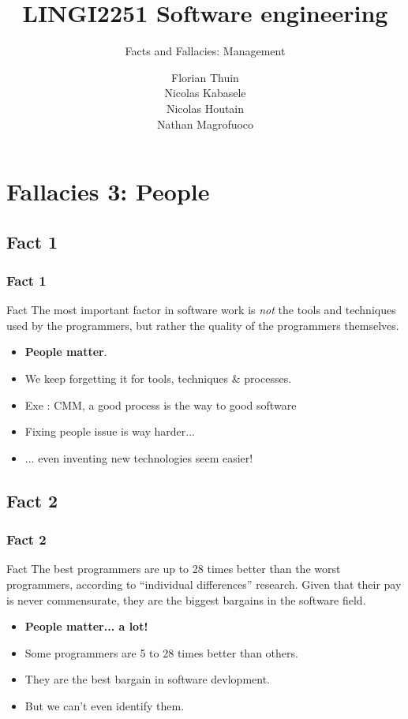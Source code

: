 \documentclass{beamer}
\title{LINGI2251 Software engineering}
\subtitle{Facts and Fallacies: Management}
\author{Florian Thuin \\ Nicolas Kabasele \\ Nicolas Houtain \\ Nathan Magrofuoco}
\institute{Ecole Polytechnique de Louvain}
\begin{document}
\begin{frame}[plain]
	\titlepage{}
\end{frame}



\section{Fallacies 3: People}

\subsection{Fact 1}
\begin{frame}
    \frametitle{Fact 1}
    \begin{block}{Fact}
        The most important factor in software work is \textit{not} the tools and
        techniques used by the programmers, but rather the quality of the
        programmers themselves.
    \end{block}
    \begin{itemize}
     \pause
     \item \textbf{People matter}.
     \pause
     \item We keep forgetting it for tools, techniques \& processes.
     \pause
     \item Exe : CMM, a good process is the way to good software
     \pause
     \item Fixing people issue is way harder...
     \pause
     \item ... even inventing new technologies seem easier!
    \end{itemize}

\end{frame}

\subsection{Fact 2}
\begin{frame}
    \frametitle{Fact 2}
    \begin{block}{Fact}
    The best programmers are up to 28 times better than the worst programmers,
    according to \enquote{individual differences} research. Given that
    their pay is never commensurate, they are the biggest bargains in the
    software field.
    \end{block}
    \begin{itemize}
     \pause
     \item \textbf{People matter... a lot!}
     \pause
     \item Some programmers are 5 to 28 times better than others.
     \pause
     \item They are the best bargain in software devlopment.
     \pause
     \item But we can't even identify them.
    \end{itemize}

\end{frame}
\end{document}
